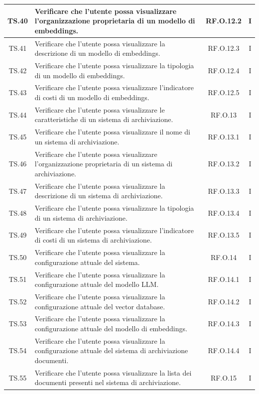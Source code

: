 \documentclass[10pt, a4paper]{article}
\begin{document}
\begin{xltabular}{\textwidth}{|c|X|c|c|}
\hline
TS.40 & Verificare che l'utente possa visualizzare l’organizzazione proprietaria di un modello di embeddings. & RF.O.12.2 & I \\
\hline
TS.41 & Verificare che l'utente possa visualizzare la descrizione di un modello di embeddings. & RF.O.12.3 & I \\
\hline
TS.42 & Verificare che l'utente possa visualizzare la tipologia di un modello di embeddings. & RF.O.12.4 & I \\
\hline
TS.43 & Verificare che l'utente possa visualizzare l’indicatore di costi di un modello di embeddings. & RF.O.12.5 & I \\
\hline
TS.44 & Verificare che l'utente possa visualizzare le caratteristiche di un sistema di archiviazione. & RF.O.13 & I \\
\hline
TS.45 & Verificare che l'utente possa visualizzare il nome di un sistema di archiviazione. & RF.O.13.1 & I \\
\hline
TS.46 & Verificare che l'utente possa visualizzare l’organizzazione proprietaria di un sistema di archiviazione. & RF.O.13.2 & I \\
\hline
TS.47 & Verificare che l'utente possa visualizzare la descrizione di un sistema di archiviazione. & RF.O.13.3 & I \\
\hline
TS.48 & Verificare che l'utente possa visualizzare la tipologia di un sistema di archiviazione. & RF.O.13.4 & I \\
\hline
TS.49 & Verificare che l'utente possa visualizzare l’indicatore di costi di un sistema di archiviazione. & RF.O.13.5 & I \\
\hline
TS.50 & Verificare che l'utente possa visualizzare la configurazione attuale del sistema. & RF.O.14 & I \\
\hline
TS.51 & Verificare che l'utente possa visualizzare la configurazione attuale del modello LLM. & RF.O.14.1 & I \\
\hline
TS.52 & Verificare che l'utente possa visualizzare la configurazione attuale del vector database. & RF.O.14.2 & I \\
\hline
TS.53 & Verificare che l'utente possa visualizzare la configurazione attuale del modello di embeddings. & RF.O.14.3 & I \\
\hline
TS.54 & Verificare che l'utente possa visualizzare la configurazione attuale del sistema di archiviazione documenti. & RF.O.14.4 & I \\
\hline
TS.55 & Verificare che l'utente possa visualizzare la lista dei documenti presenti nel sistema di archiviazione. & RF.O.15 & I \\

\end{xltabular}
\end{document}
